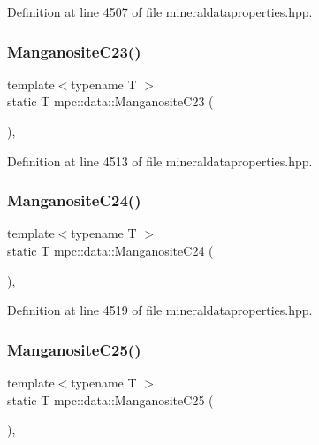 Definition at line 4507 of file mineraldataproperties.\+hpp.

\mbox{\label{namespacempc_1_1data_a4c875096453672d78f518aca2fd645fa}} 
\subsubsection{\texorpdfstring{Manganosite\+C23()}{ManganositeC23()}}
{\footnotesize\ttfamily template$<$typename T $>$ \\
static T mpc\+::data\+::\+Manganosite\+C23 (\begin{DoxyParamCaption}{ }\end{DoxyParamCaption})\hspace{0.3cm}{\ttfamily [inline]}, {\ttfamily [static]}}



Definition at line 4513 of file mineraldataproperties.\+hpp.

\mbox{\label{namespacempc_1_1data_a7dd40cb8fa698cc74ce130edf0cc633c}} 
\subsubsection{\texorpdfstring{Manganosite\+C24()}{ManganositeC24()}}
{\footnotesize\ttfamily template$<$typename T $>$ \\
static T mpc\+::data\+::\+Manganosite\+C24 (\begin{DoxyParamCaption}{ }\end{DoxyParamCaption})\hspace{0.3cm}{\ttfamily [inline]}, {\ttfamily [static]}}



Definition at line 4519 of file mineraldataproperties.\+hpp.

\mbox{\label{namespacempc_1_1data_adb94b41d0fafee68664168398ae55d15}} 
\subsubsection{\texorpdfstring{Manganosite\+C25()}{ManganositeC25()}}
{\footnotesize\ttfamily template$<$typename T $>$ \\
static T mpc\+::data\+::\+Manganosite\+C25 (\begin{DoxyParamCaption}{ }\end{DoxyParamCaption})\hspace{0.3cm}{\ttfamily [inline]}, {\ttfamily [static]}}



